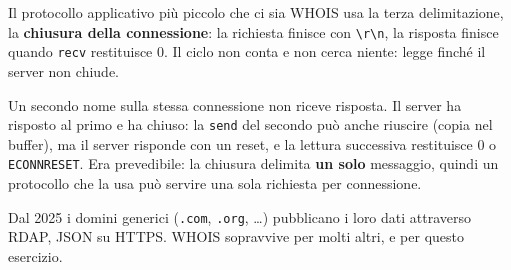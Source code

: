\begin{esercizio}{Il protocollo applicativo più piccolo che ci sia}
WHOIS usa la terza delimitazione, la \textbf{chiusura della connessione}: la richiesta finisce con
\texttt{\textbackslash r\textbackslash n}, la risposta finisce quando \texttt{recv} restituisce 0. Il ciclo non conta e non
cerca niente: legge finché il server non chiude.

Un secondo nome sulla stessa connessione non riceve risposta. Il server ha risposto al primo e ha chiuso: la
\texttt{send} del secondo può anche riuscire (copia nel buffer), ma il server risponde con un reset, e la lettura
successiva restituisce 0 o \texttt{ECONNRESET}. Era prevedibile: la chiusura delimita \textbf{un solo} messaggio, quindi
un protocollo che la usa può servire una sola richiesta per connessione.

Dal 2025 i domini generici (\texttt{.com}, \texttt{.org}, \ldots) pubblicano i loro dati attraverso RDAP, JSON su HTTPS.
WHOIS sopravvive per molti altri, e per questo esercizio.
\end{esercizio}

